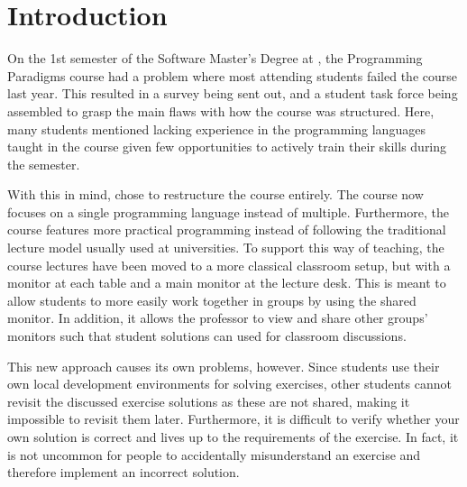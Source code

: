 \chapter{Introduction} \label{chap:introduction}
On the 1st semester of the Software Master’s Degree at \aau{}, the Programming Paradigms course had a problem where most attending students failed the course last year. 
This resulted in a survey being sent out, and a student task force being assembled to grasp the main flaws with how the course was structured. 
Here, many students mentioned lacking experience in the programming languages taught in the course given few opportunities to actively train their skills during the semester. 


With this in mind, \aau{} chose to restructure the course entirely. 
The course now focuses on a single programming language instead of multiple. 
Furthermore, the course features more practical programming instead of following the traditional lecture model usually used at universities. 
To support this way of teaching, the course lectures have been moved to a more classical classroom setup, but with a monitor at each table and a main monitor at the lecture desk. 
This is meant to allow students to more easily work together in groups by using the shared monitor.
In addition, it allows the professor to view and share other groups' monitors such that student solutions can used for classroom discussions. 


This new approach causes its own problems, however. 
Since students use their own local development environments for solving exercises, other students cannot revisit the discussed exercise solutions as these are not shared, making it impossible to revisit them later. 
Furthermore, it is difficult to verify whether your own solution is correct and lives up to the requirements of the exercise. 
In fact, it is not uncommon for people to accidentally misunderstand an exercise and therefore implement an incorrect solution.

